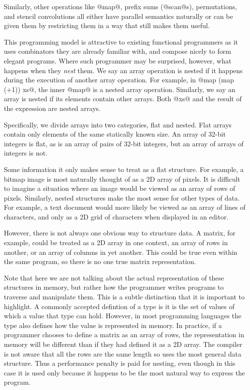Similarly, other operations like @map@, prefix sums (@scan@s), permutations, and stencil convolutions all either have parallel semantics naturally or can be given them by restricting them in a way that still makes them useful.

This programming model is attractive to existing functional programmers as it uses combinators they are already familiar with, and compose nicely to form elegant programs. Where such programmer may be surprised, however, what happens when they \emph{nest} them. We say an array operation is nested if it happens during the execution of another array operation. For example, in @map (map (+1)) xs@, the inner @map@ is a nested array operation. Similarly, we say an array is nested if its elements contain other arrays. Both @xs@ and the result of the expression are nested arrays.

Specifically, we divide arrays into two categories, flat and nested. Flat arrays contain only elements of the same statically known size. An array of 32-bit integers is flat, as is an array of pairs of 32-bit integers, but an array of arrays of integers is not.


Some information it only makes sense to treat as a flat structure. For example, a bitmap image is most naturally thought of as a 2D array of pixels. It is difficult to imagine a situation where an image would be viewed as an array of rows of pixels. Similarly, nested structures make the most sense for other types of data. For example, a text document would more likely be viewed as an array of lines of characters, and only as a 2D grid of characters when displayed in an editor.

However, there is not always one obvious way to structure data. A matrix, for example, could be treated as a 2D array in one context, an array of rows in another, or an array of columns in yet another. This could be true even within the same program, so there is no one true matrix representation.

Note that here we are not talking about the actual representation of these structures in memory, but rather how the programmer writes programs to traverse and manipulate them. This is a subtle distinction that it is important to highlight. A commonly accepted defintion of a type is it is the set of values of which a value that type can hold. However, in most programming languages the type also defines how the value is represented in memory. In practice, if a programmer chooses to define a matrix as an array of rows, the representation in memory will be different than if they had defined it as a 2D array. The compiler is not aware that all the rows are the same length so uses the most general data structure. Thus a performance penalty is paid for nesting, even though in this case it is used only because it happens to be the most natural way to express the program.

